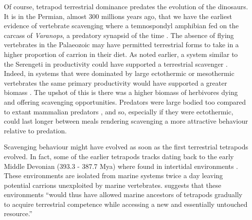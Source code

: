 \documentclass[a4paper,12pt]{article}
\begin{document}
Of course, tetrapod terrestrial dominance predates the evolution of the dinosaurs.
It is in the Permian, almost 300 millions years ago, that we have the earliest evidence of vertebrate scavenging where a temnospondyl amphibian fed on the carcass of \textit{Varanops}, a predatory synapsid of the time \citep{reisz2006articulated}.
The absence of flying vertebrates in the Palaeozoic may have permitted terrestrial forms to take in a higher proportion of carrion in their diet.
As noted earlier, a system similar to the Serengeti in productivity could have supported a terrestrial scavenger \citep{ruxton2004obligate}.
Indeed, in systems that were dominated by large ectothermic or mesothermic vertebrates 
the same primary productivity would have supported a greater biomass \citep{mcnab2009resources}.
The upshot of this is there was a higher biomass of herbivores dying and offering scavenging opportunities.
Predators were large bodied too compared to extant mammalian predators \citep{mcnab2009resources}, and so, especially if they were ectothermic, could last longer between meals rendering scavenging a more attractive behaviour relative to predation.
 

Scavenging behaviour might have evolved as soon as the first terrestrial tetrapods evolved.
In fact, some of the earlier tetrapods tracks dating back to the early Middle Devonian (393.3 - 387.7 Mya) where found in intertidal environments \citep{Niedzwiedzki2009}.
These environments are isolated from marine systems twice a day leaving potential carrions unexploited by marine vertebrates.
\cite{Niedzwiedzki2009} suggests that these environments ``would thus have allowed marine ancestors of tetrapods gradually to acquire terrestrial competence while accessing a new and essentially untouched resource.''
\end{document}
